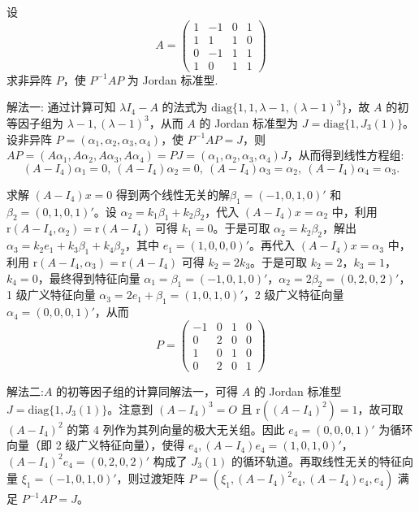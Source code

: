 \documentclass[../../main.tex]{subfiles}%
\begin{document}
\begin{example}
设
\[
A = \begin{pmatrix}
1 & -1 & 0 & 1 \\
1 & 1 & 1 & 0 \\
0 & -1 & 1 & 1 \\
1 & 0 & 1 & 1
\end{pmatrix}
\]
求非异阵 $P$，使 $P^{-1}AP$ 为 Jordan 标准型.
\end{example}
\begin{solution}

{\color{blue}解法一:}
通过计算可知 $\lambda I_4 - A$ 的法式为 $\mathrm{diag}\{1,1,\lambda - 1,(\lambda - 1)^3\}$，故 $A$ 的初等因子组为 $\lambda - 1,(\lambda - 1)^3$，从而 $A$ 的 Jordan 标准型为 $J = \mathrm{diag}\{1,J_3(1)\}$。设非异阵 $P = (\alpha_1,\alpha_2,\alpha_3,\alpha_4)$，使 $P^{-1}AP = J$，则 $AP = (A\alpha_1,A\alpha_2,A\alpha_3,A\alpha_4) = PJ = (\alpha_1,\alpha_2,\alpha_3,\alpha_4)J$，从而得到线性方程组:
\[(A - I_4)\alpha_1 = 0,\ (A - I_4)\alpha_2 = 0,\ (A - I_4)\alpha_3 = \alpha_2,\ (A - I_4)\alpha_4 = \alpha_3.\]

求解 $(A - I_4)x = 0$ 得到两个线性无关的解$\beta_1 = (-1,0,1,0)'$ 和 $\beta_2 = (0,1,0,1)'$。设 $\alpha_2 = k_1\beta_1 + k_2\beta_2$，代入 $(A - I_4)x = \alpha_2$ 中，利用 $\mathrm{r}(A - I_4,\alpha_2) = \mathrm{r}(A - I_4)$ 可得 $k_1 = 0$。于是可取 $\alpha_2 = k_2\beta_2$，解出 $\alpha_3 = k_2e_1 + k_3\beta_1 + k_4\beta_2$，其中 $e_1 = (1,0,0,0)'$。再代入 $(A - I_4)x = \alpha_3$ 中，利用 $\mathrm{r}(A - I_4,\alpha_3) = \mathrm{r}(A - I_4)$ 可得 $k_2 = 2k_3$。于是可取 $k_2 = 2$，$k_3 = 1$，$k_4 = 0$，最终得到特征向量 $\alpha_1 = \beta_1 = (-1,0,1,0)'$，$\alpha_2 = 2\beta_2 = (0,2,0,2)'$，1 级广义特征向量 $\alpha_3 = 2e_1 + \beta_1 = (1,0,1,0)'$，2 级广义特征向量 $\alpha_4 = (0,0,0,1)'$，从而
\[
P = \begin{pmatrix}
-1 & 0 & 1 & 0 \\
0 & 2 & 0 & 0 \\
1 & 0 & 1 & 0 \\
0 & 2 & 0 & 1
\end{pmatrix}
\]

{\color{blue}解法二:}$A$ 的初等因子组的计算同解法一，可得 $A$ 的 Jordan 标准型 $J = \mathrm{diag}\{1,J_3(1)\}$。注意到 $(A - I_4)^3 = O$ 且 $\mathrm{r}((A - I_4)^2) = 1$，故可取 $(A - I_4)^2$ 的第 4 列作为其列向量的极大无关组。因此 $e_4 = (0,0,0,1)'$ 为循环向量（即 2 级广义特征向量），使得 $e_4,(A - I_4)e_4 = (1,0,1,0)'$，$(A - I_4)^2e_4 = (0,2,0,2)'$ 构成了 $J_3(1)$ 的循环轨道。再取线性无关的特征向量 $\xi_1 = (-1,0,1,0)'$，则过渡矩阵 $P = (\xi_1,(A - I_4)^2e_4,(A - I_4)e_4,e_4)$ 满足 $P^{-1}AP = J$。

\end{solution}
\end{document}
